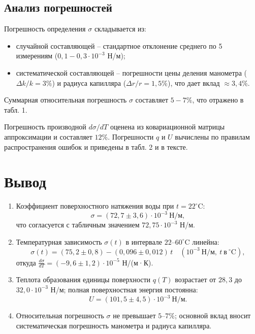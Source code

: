 \documentclass[a4paper, 12pt]{article}
\begin{document}
\subsection*{Анализ погрешностей}

Погрешность определения \(\sigma\) складывается из:
\begin{itemize}
    \item случайной составляющей – стандартное отклонение среднего по 5 измерениям (\(0,1-0,3 \cdot 10^{-3}\) Н/м);
    \item систематической составляющей – погрешности цены деления манометра (\(\Delta k/k = 3\%\)) и радиуса капилляра (\(\Delta r/r = 1,5\%\)), что дает вклад \(\approx 3,4\%\).
\end{itemize}
Суммарная относительная погрешность \(\sigma\) составляет \(5-7\%\), что отражено в табл. 1.

Погрешность производной \(d\sigma/dT\) оценена из ковариационной матрицы аппроксимации и составляет \(12\%\).
Погрешности \(q\) и \(U\) вычислены по правилам распространения ошибок и приведены в табл. 2 и в тексте.

\section{Вывод}

\begin{enumerate}
    \item Коэффициент поверхностного натяжения воды при \(t = 22^\circ\)C:
    \[
    \sigma = (72,7 \pm 3,6)\cdot10^{-3}\ \text{Н/м},
    \]
    что согласуется с табличным значением \(72,75\cdot10^{-3}\) Н/м.

    \item Температурная зависимость \(\sigma(t)\) в интервале \(22\)–\(60^\circ\)C линейна:
    \[
    \sigma(t) = (75,2 \pm 0,8) - (0,096 \pm 0,012)\,t \quad (10^{-3}\ \text{Н/м},\ t\ \text{в}\ ^\circ\text{C}),
    \]
    откуда \(\displaystyle\frac{d\sigma}{dT} = (-9,6\pm1,2)\cdot10^{-5}\) Н/(м·К).

    \item Теплота образования единицы поверхности \(q(T)\) возрастает от \(28,3\) до \(32,0\cdot10^{-3}\) Н/м; полная поверхностная энергия постоянна:
    \[
    U = (101,5\pm4,5)\cdot10^{-3}\ \text{Н/м}.
    \]

    \item Относительная погрешность \(\sigma\) не превышает \(5\)–\(7\%\); основной вклад вносит систематическая погрешность манометра и радиуса капилляра.
\end{enumerate}
\end{document}

